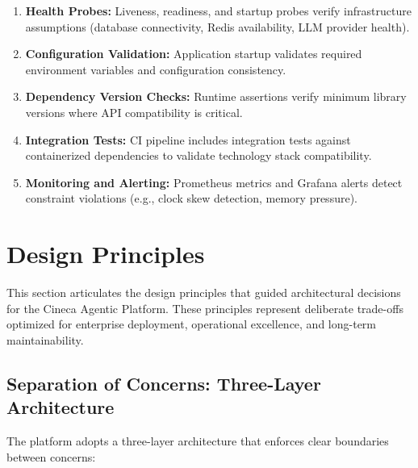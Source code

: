 \documentclass[a4paper,twoside]{sapthesis}
\begin{document}
\begin{enumerate}
    \item \textbf{Health Probes:} Liveness, readiness, and startup probes verify infrastructure assumptions (database connectivity, Redis availability, LLM provider health).
    
    \item \textbf{Configuration Validation:} Application startup validates required environment variables and configuration consistency.
    
    \item \textbf{Dependency Version Checks:} Runtime assertions verify minimum library versions where API compatibility is critical.
    
    \item \textbf{Integration Tests:} CI pipeline includes integration tests against containerized dependencies to validate technology stack compatibility.
    
    \item \textbf{Monitoring and Alerting:} Prometheus metrics and Grafana alerts detect constraint violations (e.g., clock skew detection, memory pressure).
\end{enumerate}

\section{Design Principles}
\label{sec:design-principles}

This section articulates the design principles that guided architectural decisions for the Cineca Agentic Platform. These principles represent deliberate trade-offs optimized for enterprise deployment, operational excellence, and long-term maintainability.

\subsection{Separation of Concerns: Three-Layer Architecture}
\label{subsec:three-layer}

The platform adopts a three-layer architecture that enforces clear boundaries between concerns:
\end{document}

